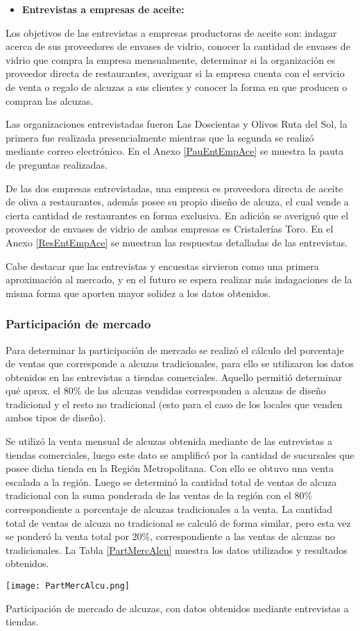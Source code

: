\begin{itemize}
\item \textbf{Entrevistas a empresas de aceite:}
\end{itemize}

Los objetivos de las entrevistas a empresas productoras de aceite son: indagar acerca de sus proveedores de envases de vidrio, conocer la cantidad de envases de vidrio que compra la empresa mensualmente, determinar si la organización es proveedor directa de restaurantes, averiguar si la empresa cuenta con el servicio de venta o regalo de alcuzas a sus clientes y conocer la forma en que producen o compran las alcuzas.

Las organizaciones entrevistadas fueron Las Doscientas y Olivos Ruta del Sol, la primera fue realizada presencialmente mientras que la segunda se realizó mediante correo electrónico. En el Anexo \ref{PauEntEmpAce} se muestra la pauta de preguntas realizadas.

De las dos empresas entrevistadas, una empresa es proveedora directa de aceite de oliva a restaurantes, además posee su propio diseño de alcuza, el cual  vende a cierta cantidad de restaurantes en forma exclusiva. En adición se averiguó que el proveedor de envases de vidrio de ambas empresas es Cristalerías Toro. En el Anexo \ref{ResEntEmpAce} se muestran las respuestas detalladas de las entrevistas.

Cabe destacar que las entrevistas y encuestas sirvieron como una primera aproximación al mercado, y en el futuro se espera realizar más indagaciones de la misma forma que aporten mayor solidez a los datos obtenidos.

\subsubsection{ Participación de mercado}

Para determinar la participación de mercado se realizó el cálculo del porcentaje de ventas que corresponde a alcuzas tradicionales, para ello se utilizaron los datos obtenidos en las entrevistas a tiendas comerciales. Aquello permitió determinar qué aprox. el 80\% de las alcuzas vendidas corresponden a alcuzas de diseño tradicional y el resto no tradicional (esto para el caso de los locales que venden ambos tipos de diseño).

Se utilizó la venta mensual de alcuzas obtenida mediante de las entrevistas a tiendas comerciales, luego este dato se amplificó por la cantidad de sucursales que posee dicha tienda en la Región Metropolitana. Con ello se obtuvo una venta escalada a la región. Luego se determinó la cantidad total de ventas de alcuza tradicional con la suma ponderada de las ventas de la región con el 80\% correspondiente a porcentaje de alcuzas tradicionales a la venta. La cantidad total de ventas de alcuza no tradicional se calculó de forma similar, pero esta vez se ponderó la venta total por 20\%, correspondiente a las ventas de alcuzas no tradicionales. La Tabla \ref{PartMercAlcu} muestra los datos utilizados y resultados obtenidos.

\begin{table}[H]
\centering
\texttt{[image: PartMercAlcu.png]}
\caption{Participación de mercado de alcuzas, con datos obtenidos mediante entrevistas a tiendas.}
\label{PartMercAlcu}
\end{table}
